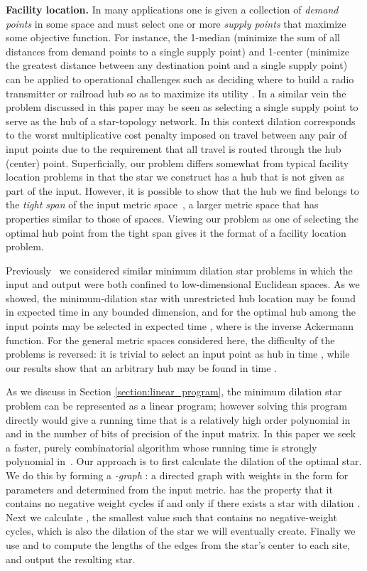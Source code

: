 \documentclass{llncs}
\begin{document}
\smallskip\noindent
{\bf Facility location.} In many applications one is given a collection of \emph{demand points} in some space and must select one or more \emph{supply points} that maximize some objective function. For instance, the 1-median (minimize the sum of all distances from demand points to a single supply point) and 1-center (minimize the greatest distance between any destination point and a single supply point) can be applied to operational challenges such as deciding where to build a radio transmitter or railroad hub so as to maximize its utility \cite{drezner_2002}.  In a similar vein the problem discussed in this paper may be seen as selecting a single supply point to serve as the hub of a star-topology network.  In this context dilation corresponds to the worst multiplicative cost penalty imposed on travel between any pair of input points due to the requirement that all travel is routed through the hub (center) point.  Superficially, our problem differs somewhat from typical facility location problems in that the star we construct has a hub that is not given as part of the input. However, it is possible to show that the hub we find belongs to the \emph{tight span} of the input metric space~\cite{DreHubMou-DM-01}, a larger metric space that has properties similar to those of  spaces. Viewing our problem as one of selecting the optimal hub point from the tight span gives it the format of a facility location problem.

Previously~\cite{Eppstein200727} we considered similar minimum dilation star problems in which the input and output were both confined to low-dimensional Euclidean spaces. As we showed, the minimum-dilation star with unrestricted hub location may be found in  expected time in any bounded dimension, and for  the optimal hub among the input points may be selected in expected time , where  is the inverse Ackermann function. For the general metric spaces considered here, the difficulty of the problems is reversed: it is trivial to select an input point as hub in time , while our results show that an arbitrary hub may be found in time .

As we discuss in Section \ref{section:linear_program}, the minimum dilation star problem can be represented as a linear program; however solving this program directly would give a running time that is a relatively high order polynomial in  and in the number of bits of precision of the input matrix.  In this paper we seek a faster, purely combinatorial algorithm whose running time is strongly polynomial in~.  Our approach is to first calculate the dilation  of the optimal star.  We do this by forming a \emph{-graph} : a directed graph with weights in the form  for parameters  and  determined from the input metric.   has the property that it contains no negative weight cycles if and only if there exists a star with dilation .  Next we calculate , the smallest value such that  contains no negative-weight cycles, which is also the dilation of the star we will eventually create.  Finally we use  and  to compute the lengths of the edges from the star's center to each site, and output the resulting star.
\end{document}

